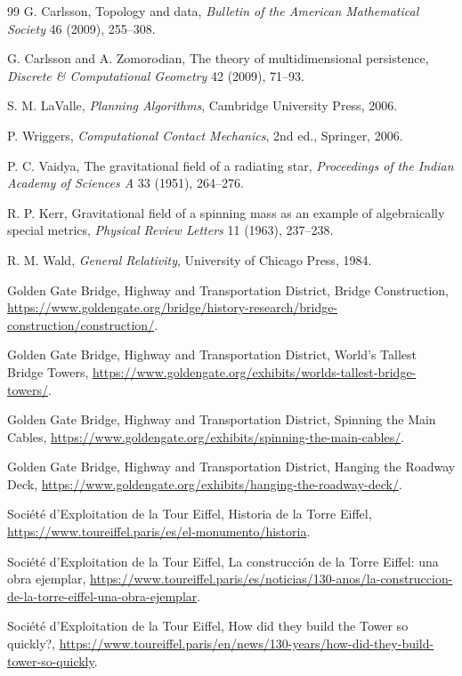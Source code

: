 \begin{thebibliography}{99}
G. Carlsson,
Topology and data,
\emph{Bulletin of the American Mathematical Society} 46 (2009), 255--308.

G. Carlsson and A. Zomorodian,
The theory of multidimensional persistence,
\emph{Discrete \& Computational Geometry} 42 (2009), 71--93.

S. M. LaValle,
\emph{Planning Algorithms},
Cambridge University Press, 2006.

P. Wriggers,
\emph{Computational Contact Mechanics},
2nd ed., Springer, 2006.

P. C. Vaidya,
The gravitational field of a radiating star,
\emph{Proceedings of the Indian Academy of Sciences A} 33 (1951), 264--276.

R. P. Kerr,
Gravitational field of a spinning mass as an example of algebraically special metrics,
\emph{Physical Review Letters} 11 (1963), 237--238.

R. M. Wald,
\emph{General Relativity},
University of Chicago Press, 1984.

Golden Gate Bridge, Highway and Transportation District,
Bridge Construction,
\url{https://www.goldengate.org/bridge/history-research/bridge-construction/construction/}.

Golden Gate Bridge, Highway and Transportation District,
World's Tallest Bridge Towers,
\url{https://www.goldengate.org/exhibits/worlds-tallest-bridge-towers/}.

Golden Gate Bridge, Highway and Transportation District,
Spinning the Main Cables,
\url{https://www.goldengate.org/exhibits/spinning-the-main-cables/}.

Golden Gate Bridge, Highway and Transportation District,
Hanging the Roadway Deck,
\url{https://www.goldengate.org/exhibits/hanging-the-roadway-deck/}.

Société d'Exploitation de la Tour Eiffel,
Historia de la Torre Eiffel,
\url{https://www.toureiffel.paris/es/el-monumento/historia}.

Société d'Exploitation de la Tour Eiffel,
La construcción de la Torre Eiffel: una obra ejemplar,
\url{https://www.toureiffel.paris/es/noticias/130-anos/la-construccion-de-la-torre-eiffel-una-obra-ejemplar}.

Société d'Exploitation de la Tour Eiffel,
How did they build the Tower so quickly?,
\url{https://www.toureiffel.paris/en/news/130-years/how-did-they-build-tower-so-quickly}.


\end{thebibliography}
